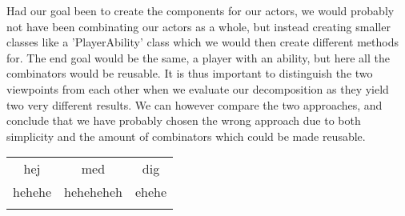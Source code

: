 Had our goal been to create the components for our actors, we would probably not have been combinating our actors as a whole, but instead creating smaller classes like a 'PlayerAbility' class which we would then create different methods for. The end goal would be the same, a player with an ability, but here all the combinators would be reusable. It is thus important to distinguish the two viewpoints from each other when we evaluate our decomposition as they yield two very different results. We can however compare the two approaches, and conclude that we have probably chosen the wrong approach due to both simplicity and the amount of combinators which could be made reusable. 
\begin{tabular}{c c c}
	 hej   & med       & dig   \\
	hehehe & heheheheh & ehehe \\
	       &           &
\end{tabular}
